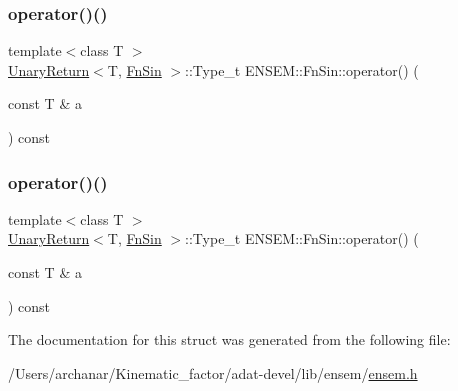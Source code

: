 \mbox{\label{structENSEM_1_1FnSin_aa82ed3f0ebd57960c04e240acba9184b}} 
\subsubsection{\texorpdfstring{operator()()}{operator()()}\hspace{0.1cm}{\footnotesize\ttfamily [2/3]}}
{\footnotesize\ttfamily template$<$class T $>$ \\
\mbox{\hyperlink{structENSEM_1_1UnaryReturn}{Unary\+Return}}$<$T, \mbox{\hyperlink{structENSEM_1_1FnSin}{Fn\+Sin}} $>$\+::Type\+\_\+t E\+N\+S\+E\+M\+::\+Fn\+Sin\+::operator() (\begin{DoxyParamCaption}\item[{const T \&}]{a }\end{DoxyParamCaption}) const\hspace{0.3cm}{\ttfamily [inline]}}

\mbox{\label{structENSEM_1_1FnSin_aa82ed3f0ebd57960c04e240acba9184b}} 
\subsubsection{\texorpdfstring{operator()()}{operator()()}\hspace{0.1cm}{\footnotesize\ttfamily [3/3]}}
{\footnotesize\ttfamily template$<$class T $>$ \\
\mbox{\hyperlink{structENSEM_1_1UnaryReturn}{Unary\+Return}}$<$T, \mbox{\hyperlink{structENSEM_1_1FnSin}{Fn\+Sin}} $>$\+::Type\+\_\+t E\+N\+S\+E\+M\+::\+Fn\+Sin\+::operator() (\begin{DoxyParamCaption}\item[{const T \&}]{a }\end{DoxyParamCaption}) const\hspace{0.3cm}{\ttfamily [inline]}}



The documentation for this struct was generated from the following file\+:\begin{DoxyCompactItemize}
\item 
/\+Users/archanar/\+Kinematic\+\_\+factor/adat-\/devel/lib/ensem/\mbox{\hyperlink{adat-devel_2lib_2ensem_2ensem_8h}{ensem.\+h}}\end{DoxyCompactItemize}

